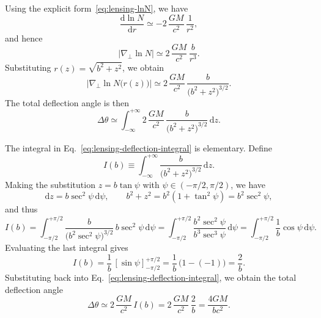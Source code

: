 \documentclass[11pt]{article}
\begin{document}
Using the explicit form~\eqref{eq:lensing-lnN}, we have
\begin{equation}
  \frac{\mathrm{d}\ln N}{\mathrm{d}r}
  \simeq -2\,\frac{GM}{c^2}\,\frac{1}{r^2},
\end{equation}
and hence
\begin{equation}
  \left|\nabla_\perp \ln N\right|
  \simeq 2\,\frac{GM}{c^2}\,\frac{b}{r^3}.
\end{equation}
Substituting $r(z) = \sqrt{b^2 + z^2}$, we obtain
\begin{equation}
  \left|\nabla_\perp \ln N\bigl(r(z)\bigr)\right|
  \simeq 2\,\frac{GM}{c^2}\,
    \frac{b}{\bigl(b^2 + z^2\bigr)^{3/2}}.
\end{equation}
The total deflection angle is then
\begin{equation}
  \Delta\theta
  \simeq \int_{-\infty}^{+\infty}
          2\,\frac{GM}{c^2}\,
          \frac{b}{\bigl(b^2 + z^2\bigr)^{3/2}}
        \,\mathrm{d}z.
  \label{eq:lensing-deflection-integral}
\end{equation}

The integral in Eq.~\eqref{eq:lensing-deflection-integral} is elementary.
Define
\begin{equation}
  I(b)
  \equiv \int_{-\infty}^{+\infty}
          \frac{b}{\bigl(b^2 + z^2\bigr)^{3/2}}
        \,\mathrm{d}z.
\end{equation}
Making the substitution $z = b \tan\psi$ with $\psi \in (-\pi/2,\pi/2)$,
we have
\begin{equation}
  \mathrm{d}z = b \sec^2\psi\,\mathrm{d}\psi,
  \qquad
  b^2 + z^2 = b^2(1 + \tan^2\psi) = b^2 \sec^2\psi,
\end{equation}
and thus
\begin{equation}
  I(b)
  = \int_{-\pi/2}^{+\pi/2}
      \frac{b}{\bigl(b^2 \sec^2\psi\bigr)^{3/2}}
      \,b \sec^2\psi\,\mathrm{d}\psi
  = \int_{-\pi/2}^{+\pi/2}
      \frac{b^2 \sec^2\psi}{b^3 \sec^3\psi}
      \,\mathrm{d}\psi
  = \int_{-\pi/2}^{+\pi/2}
      \frac{1}{b}\cos\psi\,\mathrm{d}\psi.
\end{equation}
Evaluating the last integral gives
\begin{equation}
  I(b)
  = \frac{1}{b}\,\left[\sin\psi\right]_{-\pi/2}^{+\pi/2}
  = \frac{1}{b}\,\bigl(1 - (-1)\bigr)
  = \frac{2}{b}.
\end{equation}
Substituting back into Eq.~\eqref{eq:lensing-deflection-integral}, we obtain
the total deflection angle
\begin{equation}
  \Delta\theta
  \simeq 2\,\frac{GM}{c^2}\,I(b)
  = 2\,\frac{GM}{c^2}\,\frac{2}{b}
  = \frac{4GM}{b c^2}.
  \label{eq:lensing-dtheta-result}
\end{equation}
\end{document}
